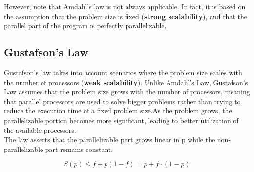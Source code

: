 However, note that Amdahl's law is not always applicable. In fact, it is based on the assumption that the problem size is fixed (\textbf{strong scalability}), and that the parallel part of the program is perfectly parallelizable.

\subsection{Gustafson's Law}

Gustafson's law takes into account scenarios where the problem size scales with the number of processors (\textbf{weak scalability}).
Unlike Amdahl's Law, Gustafson's Law assumes that the problem size grows with the number of processors, meaning that parallel processors are used to solve bigger problems rather than trying to reduce the execution time of a fixed problem size.As the problem grows, the parallelizable portion becomes more significant, leading to better utilization of the available processors.\\
The law asserts that the parallelizable part grows linear in p while the non-parallelizable part remains constant.

\begin{equation}
   S(p) \leq f + p(1-f) = p + f\cdot(1-p)
\end{equation}